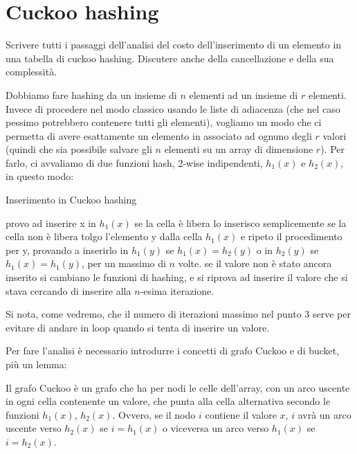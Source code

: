 \chapter {Cuckoo hashing}

\begin{problem*}
    Scrivere tutti i passaggi dell'analisi del costo dell'inserimento
    di un elemento in una tabella di cuckoo hashing. Discutere anche
    della cancellazione e della sua complessità.
\end{problem*}

Dobbiamo fare hashing da un insieme di $n$ elementi ad un insieme di $r$
elementi. Invece di procedere nel modo classico usando le liste di adiacenza
(che nel caso pessimo potrebbero contenere tutti gli elementi), vogliamo un
modo che ci permetta di avere esattamente un elemento in associato ad ognuno
degli $r$ valori (quindi che sia possibile salvare gli $n$ elementi su un array
di dimensione $r$).
Per farlo, ci avvaliamo di due funzioni hash, 2-wise indipendenti, $h_1(x)$ e
$h_2(x)$, in questo modo:

\begin{algorithm}
    \caption{Inserimento in Cuckoo hashing}
    \begin{algorithmic}[1]
        \STATE provo ad inserire x in $h_1(x)$
        \STATE se la cella è libera lo inserisco semplicemente
        \STATE se la cella non è libera tolgo l'elemento y dalla cella $h_1(x)$
        e ripeto il procedimento per y, provando a inserirlo in $h_1(y)$ se
        $h_1(x) = h_2(y)$ o in $h_2(y)$ se $h_1(x) = h_1(y)$, per un massimo di
        $n$ volte.
        \STATE se il valore non è stato ancora inserito si cambiano le funzioni
        di hashing, e si riprova ad inserire il valore che si stava cercando di
        inserire alla $n$-esima iterazione.
    \end{algorithmic}
\end{algorithm}

Si nota, come vedremo, che il numero di iterazioni massimo nel punto 3 serve
per evitare di andare in loop quando si tenta di inserire un valore.

Per fare l'analisi è necessario introdurre i concetti di grafo Cuckoo e di
bucket, più un lemma:

\begin{definition*}
    Il grafo Cuckoo è un grafo che ha per nodi le celle dell'array, con un arco
    uscente in ogni cella contenente un valore, che punta alla cella alternativa
    secondo le funzioni $h_1(x)$, $h_2(x)$. Ovvero, se il nodo $i$ contiene il
    valore $x$, $i$ avrà un arco uscente verso $h_2(x)$ se $i = h_1(x)$ o
    viceversa un arco verso $h_1(x)$ se $i = h_2(x)$.
\end{definition*}

